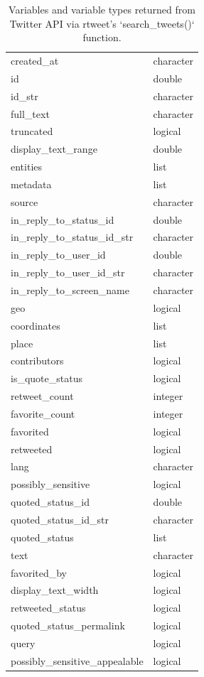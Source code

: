 \documentclass[
]{article}
\begin{document}
\begin{table}

\caption{\label{tab:ad-rtweet-variables-table}Variables and variable types returned from Twitter API via rtweet's `search_tweets()` function.}
\centering
\begin{tabular}[t]{ll}
\toprule
created\_at & character\\
id & double\\
id\_str & character\\
full\_text & character\\
truncated & logical\\
\addlinespace
display\_text\_range & double\\
entities & list\\
metadata & list\\
source & character\\
in\_reply\_to\_status\_id & double\\
\addlinespace
in\_reply\_to\_status\_id\_str & character\\
in\_reply\_to\_user\_id & double\\
in\_reply\_to\_user\_id\_str & character\\
in\_reply\_to\_screen\_name & character\\
geo & logical\\
\addlinespace
coordinates & list\\
place & list\\
contributors & logical\\
is\_quote\_status & logical\\
retweet\_count & integer\\
\addlinespace
favorite\_count & integer\\
favorited & logical\\
retweeted & logical\\
lang & character\\
possibly\_sensitive & logical\\
\addlinespace
quoted\_status\_id & double\\
quoted\_status\_id\_str & character\\
quoted\_status & list\\
text & character\\
favorited\_by & logical\\
\addlinespace
display\_text\_width & logical\\
retweeted\_status & logical\\
quoted\_status\_permalink & logical\\
query & logical\\
possibly\_sensitive\_appealable & logical\\
\bottomrule
\end{tabular}
\end{table}
\end{document}
